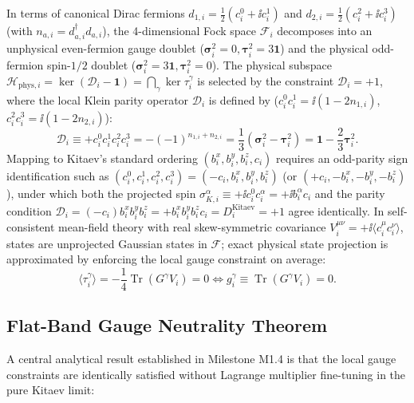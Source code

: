 \begin{proposition}
\label{prop:parity_projector}
In terms of canonical Dirac fermions $d_{1, i} = \frac{1}{2}(c_i^0 + \ii c_i^1)$ and $d_{2, i} = \frac{1}{2}(c_i^2 + \ii c_i^3)$ (with $n_{a,i} = d_{a,i}^\dagger d_{a,i}$), the 4-dimensional Fock space $\mathcal{F}_i$ decomposes into an unphysical even-fermion gauge doublet ($\bm{\sigma}_i^2 = 0, \bm{\tau}_i^2 = 3\mathbf{1}$) and the physical odd-fermion spin-$1/2$ doublet ($\bm{\sigma}_i^2 = 3\mathbf{1}, \bm{\tau}_i^2 = 0$).
The physical subspace $\mathcal{H}_{\mathrm{phys}, i} = \ker(\mathcal{D}_i - \mathbf{1}) = \bigcap_\gamma \ker \tau_i^\gamma$ is selected by the constraint $\mathcal{D}_i = +1$, where the local Klein parity operator $\mathcal{D}_i$ is defined by ($c_i^0 c_i^1 = \ii(1 - 2n_{1,i})$, $c_i^2 c_i^3 = \ii(1 - 2n_{2,i})$):
\begin{equation}
\label{eq:parity_projector}
\mathcal{D}_i \equiv + c_i^0 c_i^1 c_i^2 c_i^3 = -(-1)^{n_{1,i} + n_{2,i}} = \frac{1}{3} \left( \bm{\sigma}_i^2 - \bm{\tau}_i^2 \right) = \mathbf{1} - \frac{2}{3} \bm{\tau}_i^2.
\end{equation}
Mapping to Kitaev's standard ordering $(b_i^x, b_i^y, b_i^z, c_i)$ requires an odd-parity sign identification such as $(c_i^0, c_i^1, c_i^2, c_i^3) = (-c_i, b_i^x, b_i^y, b_i^z)$ (or $(+c_i, -b_i^x, -b_i^y, -b_i^z)$), under which both the projected spin $\sigma_{K,i}^\alpha \equiv +\ii c_i^0 c_i^\alpha = +\ii b_i^\alpha c_i$ and the parity condition $\mathcal{D}_i = (-c_i) b_i^x b_i^y b_i^z = +b_i^x b_i^y b_i^z c_i = D_i^{\mathrm{Kitaev}} = +1$ agree identically.
In self-consistent mean-field theory with real skew-symmetric covariance $V_i^{\mu\nu} = +\ii \langle c_i^\mu c_i^\nu \rangle$, states are unprojected Gaussian states in $\mathcal{F}$; exact physical state projection is approximated by enforcing the local gauge constraint on average:
\begin{equation}
\label{eq:average_gauge_condition}
\langle \tau_i^\gamma \rangle = -\frac{1}{4}\operatorname{Tr}(G^\gamma V_i) = 0 \iff g_i^\gamma \equiv \operatorname{Tr}(G^\gamma V_i) = 0.
\end{equation}
\end{proposition}

\subsection{Flat-Band Gauge Neutrality Theorem}
A central analytical result established in Milestone M1.4 is that the local gauge constraints are identically satisfied without Lagrange multiplier fine-tuning in the pure Kitaev limit:

